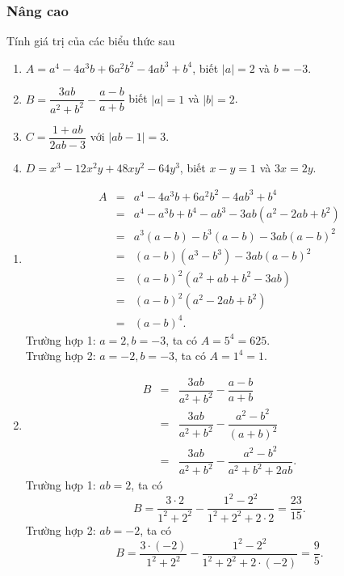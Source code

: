\subsubsection{Nâng cao}
\begin{bt}%
	Tính giá trị của các biểu thức sau
	\begin{enumerate}
		\item $A= a^{4}-4a^{3}b+6a^{2}b^{2}-4ab^{3}+b^{4}$, biết $\mid a \mid =2$ và $b=-3$.
		\item $B= \dfrac{3ab}{a^{2}+b^{2}}- \dfrac{a-b}{a+b}$ biết $\mid a \mid =1$ và $\mid b \mid =2$.
		\item $C= \dfrac{1+ab}{2ab-3}$ với $\mid ab-1 \mid =3$.
		\item $D= x^{3} -12x^{2}y +48xy^{2}-64y^{3}$, biết $x-y=1$ và $3x=2y$. 
	\end{enumerate}
	\loigiai
	{
		\begin{enumerate}
			\item {\allowdisplaybreaks
			\begin{eqnarray*}
				A &=& a^{4}-4a^{3}b+6a^{2}b^{2}-4ab^{3}+b^{4}\\
				&=& a^{4}-a^{3}b+b^{4}-ab^{3}-3ab(a^{2}-2ab+b^{2})\\
				&=& a^{3}(a-b)-b^{3}(a-b)-3ab(a-b)^{2}\\
				&=& (a-b)(a^{3}-b^{3})-3ab(a-b)^{2}\\
				&=& (a-b)^{2}(a^{2}+ab+b^{2}-3ab)\\
				&=& (a-b)^{2}(a^{2}-2ab+b^{2})\\
				&=& (a-b)^{4}.
		\end{eqnarray*}}
			Trường hợp 1: $a=2, b=-3$, ta có $A=5^{4}=625$. \\
			Trường hợp 2: $a=-2, b=-3$, ta có $A=1^{4}=1$.
			
			\item {\allowdisplaybreaks
			\begin{eqnarray*}
				B &=&  \dfrac{3ab}{a^{2}+b^{2}}- \dfrac{a-b}{a+b}\\
				&=& \dfrac{3ab}{a^{2}+b^{2}}- \dfrac{a^{2}-b^{2}}{(a+b)^{2}}\\
				&=& \dfrac{3ab}{a^{2}+b^{2}}- \dfrac{a^{2}-b^{2}}{a^{2}+b^{2}+2ab}.
		\end{eqnarray*}}
			Trường hợp 1: $ab=2$, ta có
			$$B= \dfrac{3 \cdot 2 }{1^{2}+2^{2}}- \dfrac{1^{2}-2^{2}}{1^{2}+2^{2}+2 \cdot 2}= \dfrac{23}{15}.$$
			Trường hợp 2: $ab=-2$, ta có
			$$B= \dfrac{3 \cdot (-2) }{1^{2}+2^{2}}- \dfrac{1^{2}-2^{2}}{1^{2}+2^{2}+2 \cdot (-2)}= \dfrac{9}{5}.$$
			

\end{enumerate}}
\end{bt}
